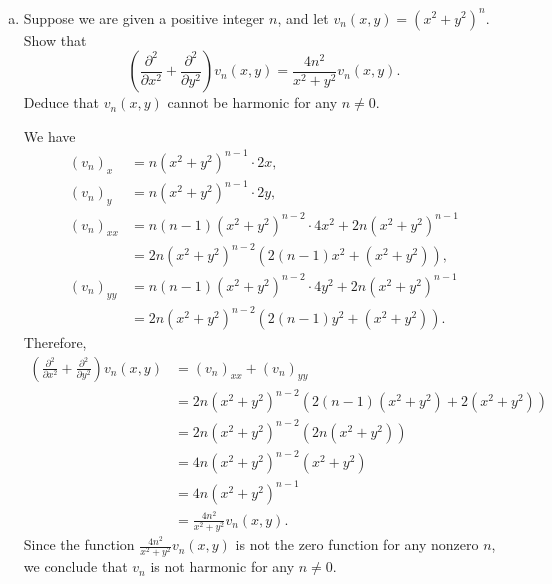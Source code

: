 \begin{problem}
\begin{enumerate}[(a)]
    \item Suppose we are given a positive integer $n$, and let $v_n(x,y)=(x^2+y^2)^n$. Show that
    \[\left(\frac{\partial^2}{\partial x^2}+\frac{\partial^2}{\partial y^2}\right)v_n(x,y)=\frac{4n^2}{x^2+y^2}v_n(x,y).\]
    Deduce that $v_n(x,y)$ cannot be harmonic for any $n\neq 0$.
    \begin{solution}
      We have
      \begin{align*}
        (v_n)_x &=n(x^2+y^2)^{n-1}\cdot 2x,\\
        (v_n)_y &=n(x^2+y^2)^{n-1}\cdot 2y, \\
        (v_n)_{xx}& =n(n-1)(x^2+y^2)^{n-2}\cdot 4x^2+2n(x^2+y^2)^{n-1}\\
        &=2n(x^2+y^2)^{n-2}(2(n-1)x^2+(x^2+y^2)),\\
        (v_n)_{yy} &=n(n-1)(x^2+y^2)^{n-2}\cdot 4y^2+2n(x^2+y^2)^{n-1}\\
        &=2n(x^2+y^2)^{n-2}(2(n-1)y^2+(x^2+y^2)).
      \end{align*}
      Therefore,
      \[\begin{split}
        \left(\frac{\partial^2}{\partial x^2}+\frac{\partial^2}{\partial y^2}\right)v_n(x,y) &= (v_n)_{xx}+(v_n)_{yy}\\
        &= 2n(x^2+y^2)^{n-2}(2(n-1)(x^2+y^2)+2(x^2+y^2))\\
        &= 2n(x^2+y^2)^{n-2}(2n(x^2+y^2))\\
        &= 4n(x^2+y^2)^{n-2}(x^2+y^2)\\
        &= 4n(x^2+y^2)^{n-1}\\
        &= \frac{4n^2}{x^2+y^2}v_n(x,y).
      \end{split}\]
      Since the function $\frac{4n^2}{x^2+y^2}v_n(x,y)$ is not the zero function for any nonzero $n$, we conclude that $v_n$ is not harmonic for any $n\neq 0$.
    \end{solution}
  \end{enumerate}
\end{problem}

